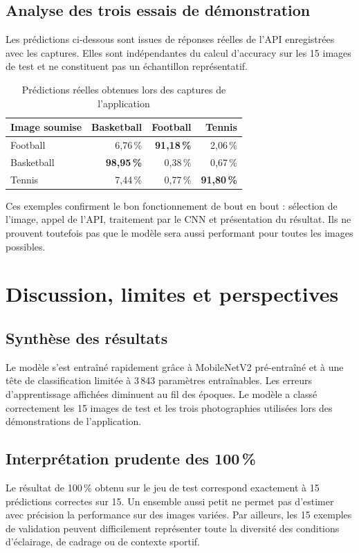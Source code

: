 \documentclass[11pt,a4paper,oneside]{report}
\begin{document}
\section{Analyse des trois essais de démonstration}
Les prédictions ci-dessous sont issues de réponses réelles de l'API enregistrées avec les captures. Elles sont indépendantes du calcul d'accuracy sur les 15 images de test et ne constituent pas un échantillon représentatif.
\begin{table}[H]\centering
\caption{Prédictions réelles obtenues lors des captures de l'application}
\begin{tabular}{lrrr}
\toprule
\textbf{Image soumise}&\textbf{Basketball}&\textbf{Football}&\textbf{Tennis}\\
\midrule
Football&6,76\,\%&\textbf{91,18\,\%}&2,06\,\%\\
Basketball&\textbf{98,95\,\%}&0,38\,\%&0,67\,\%\\
Tennis&7,44\,\%&0,77\,\%&\textbf{91,80\,\%}\\
\bottomrule
\end{tabular}
\end{table}
Ces exemples confirment le bon fonctionnement de bout en bout : sélection de l'image, appel de l'API, traitement par le CNN et présentation du résultat. Ils ne prouvent toutefois pas que le modèle sera aussi performant pour toutes les images possibles.

\chapter{Discussion, limites et perspectives}
\section{Synthèse des résultats}
Le modèle s'est entraîné rapidement grâce à MobileNetV2 pré-entraîné et à une tête de classification limitée à 3\,843 paramètres entraînables. Les erreurs d'apprentissage affichées diminuent au fil des époques. Le modèle a classé correctement les 15 images de test et les trois photographies utilisées lors des démonstrations de l'application.
\section{Interprétation prudente des 100\,\%}
Le résultat de 100\,\% obtenu sur le jeu de test correspond exactement à 15 prédictions correctes sur 15. Un ensemble aussi petit ne permet pas d'estimer avec précision la performance sur des images variées. Par ailleurs, les 15 exemples de validation peuvent difficilement représenter toute la diversité des conditions d'éclairage, de cadrage ou de contexte sportif.
\end{document}
